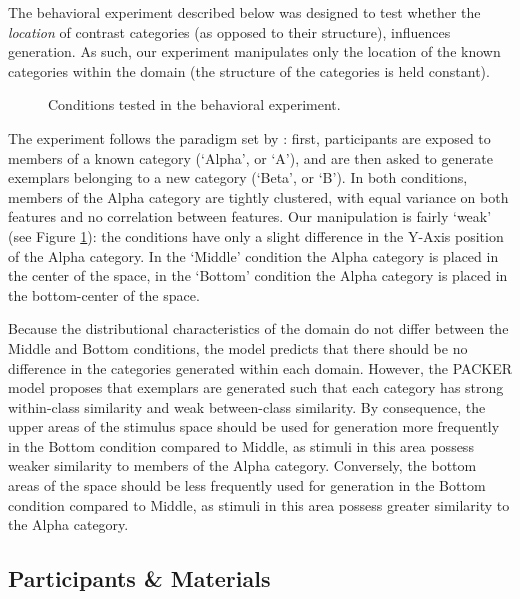 \documentclass[10pt,letterpaper]{article}
\begin{document}
The behavioral experiment described below was designed to test whether the \textit{location} of contrast categories (as opposed to their structure), influences generation. As such, our experiment manipulates only the location of the known categories within the domain (the structure of the categories is held constant). 

\begin{figure}
    \begin{center}
    
    \caption{Conditions tested in the behavioral experiment.}
    \label{fig:middle-bottom-conditions}
    \end{center}
\end{figure}

The experiment follows the paradigm set by \citet{jern2013probabilistic}: first, participants are exposed to members of a known category (`Alpha', or `A'), and are then asked to generate exemplars belonging to a new category (`Beta', or `B'). In both conditions, members of the Alpha category are tightly clustered, with equal variance on both features and no correlation between features. Our manipulation is fairly `weak' (see Figure \ref{fig:middle-bottom-conditions}): the conditions have only a slight difference in the Y-Axis position of the Alpha category. In the `Middle' condition the Alpha category is placed in the center of the space, in the `Bottom' condition the Alpha category is placed in the bottom-center of the space. 

Because the distributional characteristics of the domain do not differ between the Middle and Bottom conditions, the \citet{jern2013probabilistic} model predicts that there should be no difference in the categories generated within each domain. However, the PACKER model proposes that exemplars are generated such that each category has strong within-class similarity and weak between-class similarity. By consequence, the upper areas of the stimulus space should be used for generation more frequently in the Bottom condition compared to Middle, as stimuli in this area possess weaker similarity to members of the Alpha category. Conversely, the bottom areas of the space should be less frequently used for generation in the Bottom condition compared to Middle, as stimuli in this area possess greater similarity to the Alpha category. 

\subsection{Participants \& Materials}
\end{document}
